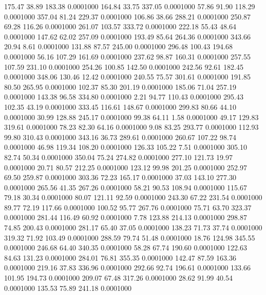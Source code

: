  175.47   38.89  183.38   0.0001000
 164.84   33.75  337.05   0.0001000
  57.86   91.90  118.29   0.0001000
 357.04   81.24  229.37   0.0001000
 106.86   38.66  288.21   0.0001000
 250.87   69.28  116.26   0.0001000
 261.07  103.57  333.72   0.0001000
 222.18   55.43   48.64   0.0001000
 147.62   62.02  257.09   0.0001000
 193.49   85.64  264.36   0.0001000
 343.66   20.94    8.61   0.0001000
 131.88   87.57  245.00   0.0001000
 296.48  100.43  194.68   0.0001000
  56.16  107.29  161.69   0.0001000
 237.62   98.87  160.31   0.0001000
 257.55  107.59  231.10   0.0001000
 254.26  100.85  142.50   0.0001000
 242.56   92.61  182.45   0.0001000
 348.06  130.46   12.42   0.0001000
 240.55   75.57  301.61   0.0001000
 191.85   80.50  265.95   0.0001000
 102.37   85.30  201.19   0.0001000
 185.06   71.04  257.19   0.0001000
 143.38   96.58  334.80   0.0001000
   2.21   94.77  110.43   0.0001000
 295.43  102.35   43.19   0.0001000
 333.45  116.61  148.67   0.0001000
 299.83   80.66   44.10   0.0001000
  30.99  128.88  245.17   0.0001000
  99.38   64.11    1.58   0.0001000
  49.17  129.83  319.61   0.0001000
  78.23   82.30   64.16   0.0001000
   9.08   83.25  293.77   0.0001000
 112.93   99.80  310.43   0.0001000
 343.16   36.73  289.61   0.0001000
 260.67  107.22   98.74   0.0001000
  46.98  119.34  108.20   0.0001000
 126.33  105.22    7.51   0.0001000
 305.10   82.74   50.34   0.0001000
 350.04   75.24  274.82   0.0001000
 277.10  121.73   19.97   0.0001000
  20.71   80.57  212.25   0.0001000
 123.12   99.98  201.25   0.0001000
 252.97   69.50  259.87   0.0001000
 303.36   72.23  165.17   0.0001000
  37.03  143.10  277.30   0.0001000
 265.56   41.35  267.26   0.0001000
  58.21   90.53  108.94   0.0001000
 115.67   79.18   30.34   0.0001000
  80.07  121.11   92.59   0.0001000
 243.30   67.22  231.54   0.0001000
  89.77   72.19  117.66   0.0001000
 100.52   95.77  267.76   0.0001000
  75.71   63.70  323.37   0.0001000
 281.44  116.49   60.92   0.0001000
   7.78  123.88  214.13   0.0001000
 298.87   74.85  200.43   0.0001000
 281.17   65.40   37.05   0.0001000
 138.23   71.73   37.74   0.0001000
 319.32   71.92  103.49   0.0001000
 288.59   79.74   51.48   0.0001000
  18.76  124.98  345.55   0.0001000
 246.68   64.40  340.35   0.0001000
  58.28   67.74  190.60   0.0001000
 122.63   84.63  131.23   0.0001000
 284.01   76.81  355.35   0.0001000
 142.47   87.59  163.36   0.0001000
 219.16   37.83  336.96   0.0001000
 292.66   92.74  196.61   0.0001000
 133.66  101.95  194.73   0.0001000
 209.07   67.48  317.26   0.0001000
  28.62   91.99   40.54   0.0001000
 135.53   75.89  241.18   0.0001000
